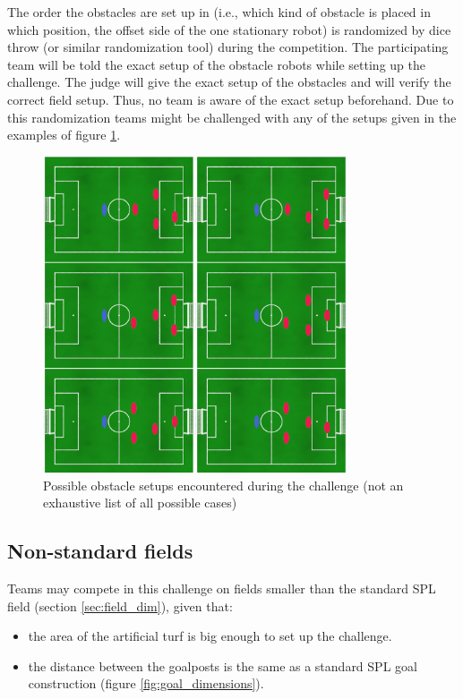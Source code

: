 The order the obstacles are set up in (i.e., which kind of obstacle is placed in which position, the offset side of the one stationary robot) is randomized by dice throw (or similar randomization tool) during the competition. The participating team will be told the exact setup of the obstacle robots while setting up the challenge. The judge will give the exact setup of the obstacles and will verify the correct field setup. Thus, no team is aware of the exact setup beforehand. Due to this randomization teams might be challenged with any of the setups given in the examples of figure \ref{fig:possible_obstacle_setups}.

\begin{figure}[ht]
    \centering
	\includegraphics[width=0.8\textwidth]{figs/obstacle_challenge_2021_a.jpeg}
	\caption{Possible obstacle setups encountered during the challenge (not an exhaustive list of all possible cases)}
	\label{fig:possible_obstacle_setups}
\end{figure}

\subsection{Non-standard fields}
\label{obstacle-non-standard-fields}

Teams may compete in this challenge on fields smaller than the standard SPL field (\cf section \ref{sec:field_dim}), given that:

\begin{itemize}
	\item the area of the artificial turf is big enough to set up the challenge.
	\item the distance between the goalposts is the same as a standard SPL goal construction (\cf figure \ref{fig:goal_dimensions}).
\end{itemize}


